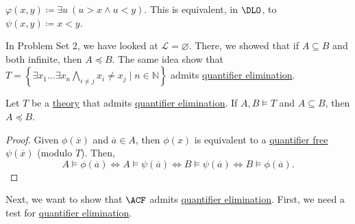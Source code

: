 \begin{eg}
	\(\varphi (x, y) \coloneqq \exists u\ (u > x \land u < y)\). This is equivalent, in \(\DLO\), to \(\psi (x, y) \coloneqq x < y\).
\end{eg}

\begin{eg}
	In Problem Set 2, we have looked at \(\mathcal{L} = \varnothing \). There, we showed that if \(A \subseteq B\) and both infinite, then \(A \preceq B\). The same idea show that \(T = \left\{ \exists x_1 \ldots \exists x_{n} \bigwedge_{i\neq j} x_i \neq x_j \mid n \in \mathbb{N} \right\} \) admits \hyperref[def:quantifier-elimination]{quantifier elimination}.
\end{eg}

\begin{proposition}
	Let \(T\) be a \hyperref[def:theory]{theory} that admits \hyperref[def:quantifier-elimination]{quantifier elimination}. If \(A, B \models T\) and \(A \subseteq B\), then \(A \preceq B\).
\end{proposition}
\begin{proof}
	Given \(\phi (\overline{x} )\) and \(\overline{a} \in A\), then \(\phi (x)\) is equivalent to a \hyperref[not:quantifier-free]{quantifier free} \(\psi (\overline{x} )\) (modulo \(T\)). Then,
	\[
		A \models \phi (\overline{a} )
		\iff A \models \psi (\overline{a} )
		\iff B \models \psi (\overline{a} )
		\iff B \models \phi (\overline{a} ).
	\]
\end{proof}

Next, we want to show that \(\ACF\) admits \hyperref[def:quantifier-elimination]{quantifier elimination}. First, we need a test for \hyperref[def:quantifier-elimination]{quantifier elimination}.

